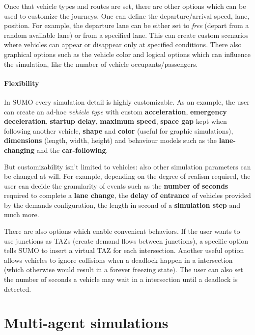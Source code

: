 Once that vehicle types and routes are set, there are other options which can be used to customize the journeys. One can define the departure/arrival speed, lane, position. For example, the departure lane can be either set to \textit{free} (depart from a random available lane) or from a specified lane. This can create custom scenarios where vehicles can appear or disappear only at specified conditions. There also graphical options such as the vehicle color and logical options which can influence the simulation, like the number of vehicle occupants/passengers.

\paragraph{Flexibility}

In SUMO every simulation detail is highly customizable.
As an example, the user can create an ad-hoc \textit{vehicle type} with custom \textbf{acceleration}, \textbf{emergency deceleration}, \textbf{startup delay}, \textbf{maximum speed}, \textbf{space gap} kept when following another vehicle, \textbf{shape} and \textbf{color} (useful for graphic simulations), \textbf{dimensions} (length, width, height) and behaviour models such as the \textbf{lane-changing} and the \textbf{car-following}.

But customizability isn't limited to vehicles: also other simulation parameters can be changed at will. For example, depending on the degree of realism required, the user can decide the granularity of events such as the \textbf{number of seconds} required to complete a \textbf{lane change}, the \textbf{delay of entrance} of vehicles provided by the demands configuration, the length in second of a \textbf{simulation step} and much more.

There are also options which enable convenient behaviors. If the user wants to use junctions as TAZs (create demand flows between junctions), a specific option tells SUMO to insert a virtual TAZ for each intersection. Another useful option allows vehicles to ignore collisions when a deadlock happen in a intersection (which otherwise would result in a forever freezing state). The user can also set the number of seconds a vehicle may wait in a intersection until a deadlock is detected.

\section{Multi-agent simulations}


